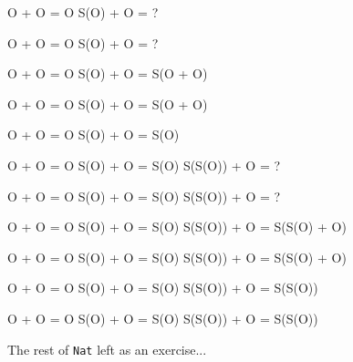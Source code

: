 \documentclass{beamer}
\newcommand{\ca}[1]{{\color{blue}#1}}
\newcommand{\cb}[1]{{\color{violet}#1}}
\begin{document}
\begin{frame}[t,fragile]
\begin{center}
\begin{overprint}
\begin{semiverbatim}
O       + O = O
S(O)    + O = ?
\end{semiverbatim}

\begin{semiverbatim}
O       + O = O
S(\ca{O})    + \cb{O} = ?
\end{semiverbatim}

\begin{semiverbatim}
O       + O = O
S(O)    + O = S(\ca{O} + \cb{O})
\end{semiverbatim}

\begin{semiverbatim}
\alert<12>{O       + O} = \alert<13>{O}
S(O)    + O = S(\alert<11-13>{O + O})
\end{semiverbatim}

\begin{semiverbatim}
O       + O = \alert{O}
S(O)    + O = S(\alert{O})
\end{semiverbatim}

\begin{semiverbatim}
O       + O = O
S(O)    + O = S(O)
S(S(O)) + O = ?
\end{semiverbatim}

\begin{semiverbatim}
O       + O = O
S(O)    + O = S(O)
S(\ca{S(O)}) + \cb{O} = ?
\end{semiverbatim}

\begin{semiverbatim}
O       + O = O
S(O)    + O = S(O)
S(S(O)) + O = S(\ca{S(O)} + \cb{O})
\end{semiverbatim}

\begin{semiverbatim}
O       + O = O
\alert<21>{S(O)    + O} = \alert<22>{S(O)}
S(S(O)) + O = S(\alert<20-22>{S(O) + O})
\end{semiverbatim}

\begin{semiverbatim}
O       + O = O
S(O)    + O = \alert{S(O)}
S(S(O)) + O = S(\alert{S(O)})
\end{semiverbatim}

\begin{semiverbatim}
O       + O = O
S(O)    + O = S(O)
S(S(O)) + O = S(S(O))
\end{semiverbatim}

\end{overprint}

\vspace{10pt}

The rest of \Verb?Nat? left as an exercise...

\end{center}

\end{frame}
\end{document}

